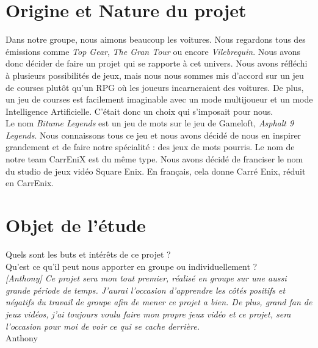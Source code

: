 \documentclass[11pt,a4paper]{article}
\begin{document}
\clearpage

\section{Origine et Nature du projet}
  Dans notre groupe, nous aimons beaucoup les voitures. Nous regardons tous des émissions comme 
  \textit{Top Gear}, \textit{The Gran Tour} ou encore \textit{Vilebrequin}. Nous avons donc décider de faire
  un projet qui se rapporte à cet univers. Nous avons réfléchi à plusieurs possibilités de jeux, mais nous
  nous sommes mis d'accord sur un jeu de courses plutôt qu'un RPG où les joueurs incarneraient des voitures.
  De plus, un jeu de courses est facilement imaginable avec un mode multijoueur et un mode Intelligence 
  Artificielle. C'était donc un choix qui s'imposait pour nous.\\
  \indent Le nom \textit{Bitume Legends} est un jeu de mots sur le jeu de Gameloft, \textit{Asphalt 9 Legends}.
  Nous connaissons tous ce jeu et nous avons décidé de nous en inspirer grandement et de faire notre 
  spécialité : des jeux de mots pourris. Le nom de notre team CarrEniX est du même type. Nous avons décidé
  de franciser le nom du studio de jeux vidéo Square Enix. En français, cela donne Carré Enix, réduit en
  CarrEnix.
\clearpage

\section{Objet de l'étude}
  Quels sont les buts et intérêts de ce projet ?\\

  Qu'est ce qu'il peut nous apporter en groupe ou individuellement ?\\

  \textit{[Anthony] Ce projet sera mon tout premier, réalisé en groupe sur une aussi grande période de temps. J'aurai l'occasion d'apprendre les côtés positifs et négatifs du travail de groupe afin de mener ce projet a bien. De plus, grand fan de jeux vidéos, j'ai toujours voulu faire mon propre jeux vidéo et ce projet, sera l'occasion pour moi de voir ce qui se cache derrière.}\\
  \indent Anthony\\
\end{document}
